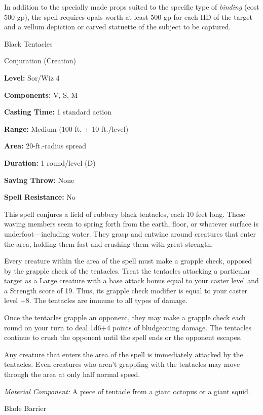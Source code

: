 \documentclass{article}
\begin{document}
In addition to the specially made props suited to the specific type of \textit{binding 
}(cost 500 gp), the spell requires opals worth at least 500 gp for each HD of the 
target and a vellum depiction or carved statuette of the subject to be captured.

\vspace{12pt}
Black Tentacles

Conjuration (Creation)

\textbf{Level:} Sor/Wiz 4

\textbf{Components:} V, S, M

\textbf{Casting Time:} 1 standard action

\textbf{Range: }Medium (100 ft. + 10 ft./level)

\textbf{Area:} 20-ft.-radius spread

\textbf{Duration:} 1 round/level (D)

\textbf{Saving Throw:} None

\textbf{Spell Resistance:} No

This spell conjures a field of rubbery black tentacles, each 10 feet long. These 
waving members seem to spring forth from the earth, floor, or whatever surface 
is underfoot---including water. They grasp and entwine around creatures that enter 
the area, holding them fast and crushing them with great strength.

Every creature within the area of the spell must make a grapple check, opposed 
by the grapple check of the tentacles. Treat the tentacles attacking a particular 
target as a Large creature with a base attack bonus equal to your caster level 
and a Strength score of 19. Thus, its grapple check modifier is equal to your caster 
level +8. The tentacles are immune to all types of damage.

Once the tentacles grapple an opponent, they may make a grapple check each round 
on your turn to deal 1d6+4 points of bludgeoning damage. The tentacles continue 
to crush the opponent until the spell ends or the opponent escapes.

Any creature that enters the area of the spell is immediately attacked by the tentacles. 
Even creatures who aren't grappling with the tentacles may move through the area 
at only half normal speed.

\textit{Material Component: }A piece of tentacle from a giant octopus or a giant 
squid.

\vspace{12pt}
Blade Barrier
\end{document}
